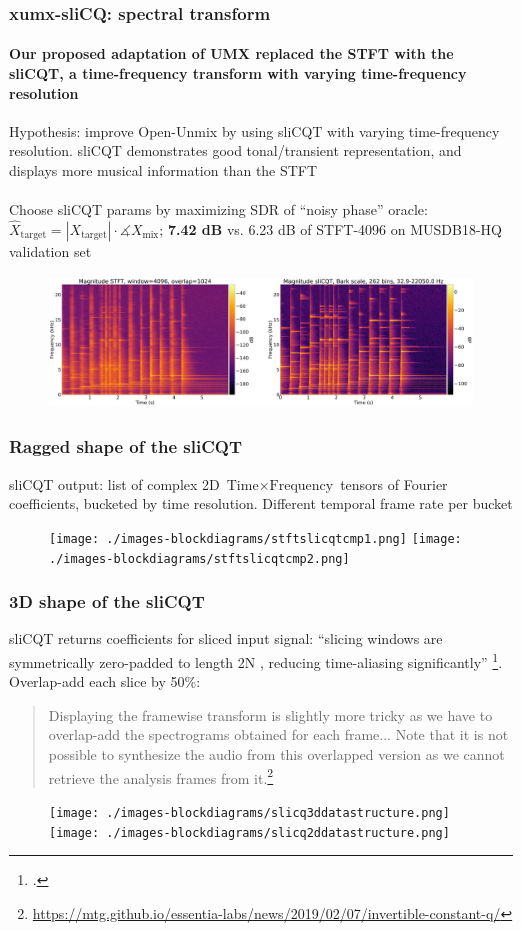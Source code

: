 \documentclass[usenames,dvipsnames]{beamer}
\begin{document}
\begin{frame}
	\frametitle{xumx-sliCQ: spectral transform}
	\framesubtitle{Our proposed adaptation of UMX replaced the STFT with the sliCQT, a time-frequency transform with varying time-frequency resolution}
	Hypothesis: improve Open-Unmix by using sliCQT with varying time-frequency resolution. sliCQT demonstrates good tonal/transient representation, and displays more musical information than the STFT\\\ \\
	Choose sliCQT params by maximizing SDR of ``noisy phase'' oracle: $\hat{X}_{\text{target}} = |X_{\text{target}}| \cdot \measuredangle{X_{\text{mix}}}$; \textbf{7.42 dB} vs. 6.23 dB of STFT-4096 on MUSDB18-HQ validation set
	\begin{figure}[ht]
		\centering
		\vspace{-0.5em}
		\includegraphics[height=3.5cm]{./images-mila-presentation/spectrograms_comparison.png}
	\end{figure}
\end{frame}

\begin{frame}
	\frametitle{Ragged shape of the sliCQT}
	sliCQT output: list of complex 2D $\text{Time} \times \text{Frequency}$ tensors of Fourier coefficients, bucketed by time resolution. Different temporal frame rate per bucket
	\begin{figure}
		\centering
		\texttt{[image: ./images-blockdiagrams/stftslicqtcmp1.png]}
		\hspace{-0.25em}
		\texttt{[image: ./images-blockdiagrams/stftslicqtcmp2.png]}
	\end{figure}
\end{frame}

\begin{frame}
	\frametitle{3D shape of the sliCQT}
	sliCQT returns coefficients for sliced input signal: ``slicing windows are symmetrically zero-padded to length 2N , reducing time-aliasing significantly'' \footcite[10]{slicq}. Overlap-add each slice by 50\%:
	\begin{quote}
		Displaying the framewise transform is slightly more tricky as we have to overlap-add the spectrograms obtained for each frame... Note that it is not possible to synthesize the audio from this overlapped version as we cannot retrieve the analysis frames from it.\footnote{\url{https://mtg.github.io/essentia-labs/news/2019/02/07/invertible-constant-q/}}
	\end{quote}
	\begin{figure}
		\centering
		\texttt{[image: ./images-blockdiagrams/slicq3ddatastructure.png]}\\
		\texttt{[image: ./images-blockdiagrams/slicq2ddatastructure.png]}
	\end{figure}
\end{frame}
\end{document}
